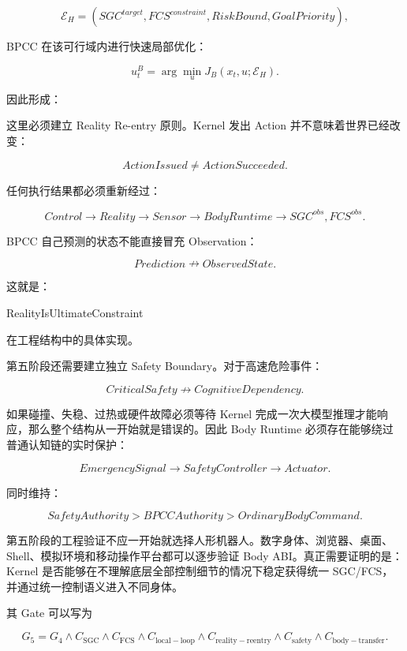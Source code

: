 \[
\mathcal E_H
=
(
SGC^{target},
FCS^{constraint},
RiskBound,
GoalPriority
),
\]

BPCC 在该可行域内进行快速局部优化：

\[
u_t^{B}
=
\arg\min_u
J_B
(x_t,u;\mathcal E_H).
\]

因此形成：

\begin{statementbox}
\centering
{}
\end{statementbox}

这里必须建立 Reality Re-entry 原则。Kernel 发出 Action 并不意味着世界已经改变：

\[
ActionIssued
\neq
ActionSucceeded.
\]

任何执行结果都必须重新经过：

\[
Control
\rightarrow
Reality
\rightarrow
Sensor
\rightarrow
BodyRuntime
\rightarrow
SGC^{obs},FCS^{obs}.
\]

BPCC 自己预测的状态不能直接冒充 Observation：

\[
Prediction
\nrightarrow
ObservedState.
\]

这就是：

\begin{statementbox}
RealityIsUltimateConstraint
\end{statementbox}

在工程结构中的具体实现。

第五阶段还需要建立独立 Safety Boundary。对于高速危险事件：

\[
CriticalSafety
\nrightarrow
CognitiveDependency.
\]

如果碰撞、失稳、过热或硬件故障必须等待 Kernel 完成一次大模型推理才能响应，那么整个结构从一开始就是错误的。因此 Body Runtime 必须存在能够绕过普通认知链的实时保护：

\[
EmergencySignal
\rightarrow
SafetyController
\rightarrow
Actuator.
\]

同时维持：

\[
SafetyAuthority
>
BPCCAuthority
>
OrdinaryBodyCommand.
\]

第五阶段的工程验证不应一开始就选择人形机器人。数字身体、浏览器、桌面、Shell、模拟环境和移动操作平台都可以逐步验证 Body ABI。真正需要证明的是：Kernel 是否能够在不理解底层全部控制细节的情况下稳定获得统一 SGC/FCS，并通过统一控制语义进入不同身体。

其 Gate 可以写为

\[
G_5
=
G_4
\land
C_{\mathrm{SGC}}
\land
C_{\mathrm{FCS}}
\land
C_{\mathrm{local-loop}}
\land
C_{\mathrm{reality-reentry}}
\land
C_{\mathrm{safety}}
\land
C_{\mathrm{body-transfer}}.
\]

